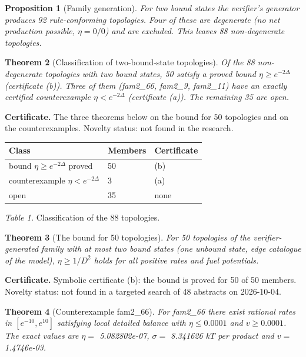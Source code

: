 \documentclass[11pt]{article}
\newtheorem{theorem}{Theorem}\newtheorem{proposition}[theorem]{Proposition}\newtheorem{lemma}[theorem]{Lemma}\newtheorem{corollary}[theorem]{Corollary}
\theoremstyle{definition}\newtheorem{definition}[theorem]{Definition}\newtheorem{example}[theorem]{Example}
\begin{document}
\begin{proposition}[Family generation]
For two bound states the verifier's generator produces 92 rule-conforming topologies. Four of these are degenerate (no net production possible, \(\eta=0/0\)) and are excluded. This leaves 88 non-degenerate topologies.
\end{proposition}

\begin{theorem}[Classification of two-bound-state topologies]
Of the 88 non-degenerate topologies with two bound states, 50 satisfy a proved bound \(\eta\ge e^{-2\Delta}\) (certificate (b)). Three of them (fam2\_66, fam2\_9, fam2\_11) have an exactly certified counterexample \(\eta<e^{-2\Delta}\) (certificate (a)). The remaining 35 are open.
\end{theorem}

\textbf{Certificate.} The three theorems below on the bound for 50 topologies and on the counterexamples. Novelty status: not found in the research.

{\def\LTcaptype{none} %
\begin{longtable}[]{@{}lll@{}}
\toprule\noalign{}
Class & Members & Certificate \\
\midrule\noalign{}
\endhead
\bottomrule\noalign{}
\endlastfoot
bound \(\eta\ge e^{-2\Delta}\) proved & 50 & (b) \\
counterexample \(\eta<e^{-2\Delta}\) & 3 & (a) \\
open & 35 & none \\
\end{longtable}
}

\emph{Table 1.} Classification of the 88 topologies.

\begin{theorem}[The bound for 50 topologies]
For 50 topologies of the verifier-generated family with at most two bound states (one unbound state, edge catalogue of the model), \(\eta\ge 1/D^{2}\) holds for all positive rates and fuel potentials.
\end{theorem}

\textbf{Certificate.} Symbolic certificate (b): the bound is proved for 50 of 50 members. Novelty status: not found in a targeted search of 48 abstracts on 2026-10-04.

\begin{theorem}[Counterexample fam2_66]
For fam2\_66 there exist rational rates in \([e^{-10},e^{10}]\) satisfying local detailed balance with \(\eta\le 0.0001\) and \(v\ge 0.0001\). The exact values are \(\eta=\) 5.082802e-07, \(\sigma=\) 8.341626 \(kT\) per product and \(v=\) 1.4746e-03.
\end{theorem}
\end{document}
